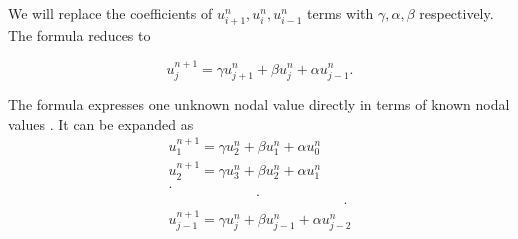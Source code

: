 \documentclass[12pt, oneside]{book}
\theoremstyle{plain}
\theoremstyle{definition}
\begin{document}
We will replace the coefficients of $ u^n_{i + 1},  u^n_i,  u^n_{i - 1}$  terms with $\gamma,  \alpha, \beta$ respectively. The formula reduces to

\begin{equation}
u_j^{n+1} = \gamma u_{j+1}^{n} + \beta u_{j}^{n} + \alpha u_{j-1}^{n} .
\end{equation}

The formula expresses one unknown nodal value directly in terms of known nodal values  \cite{evans}. It can be expanded as
\begin{multline}
u_1^{n+1} = \gamma u_{2}^{n} + \beta u_{1}^{n} + \alpha u_{0}^{n} \\
u_2^{n+1} = \gamma u_{3}^{n} + \beta u_{2}^{n} + \alpha u_{1}^{n} \\
.\\
\hspace{75pt} .\\
\hspace{150pt} .\\
u_{j-1}^{n+1} = \gamma u_{j}^{n} + \beta u_{j-1}^{n} + \alpha u_{j-2}^{n} 
\end{multline}
\end{document}
